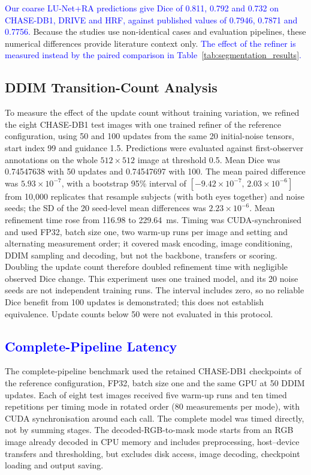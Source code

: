\documentclass[jimaging,article,submit,pdftex,moreauthors]
  {Definitions/mdpi}
\DeclareRobustCommand{\rev}[1]{\textcolor{blue}{#1}}
\newcommand{\revbegin}{\begingroup\color{blue}}
\DeclareRobustCommand{\rev}[1]{#1}
\newcommand{\revbegin}{\begingroup}
\newcommand{\revend}{\ifhmode\par\fi\endgroup}
\providecommand{\linelabel}[1]{}
\newcommand{\seclabel}[1]{\linelabel{rev:sec:#1}}
\newcommand{\secend}[1]{\linelabel{rev:end:#1}}
\begin{document}
\rev{Our coarse LU-Net+RA predictions give Dice of 0.811, 0.792 and 0.732 on CHASE-DB1, DRIVE and HRF, against published values of 0.7946, 0.7871 and 0.7756.} Because the studies use non-identical cases and evaluation pipelines, these numerical differences provide literature context only. \rev{The effect of the refiner is measured instead by the paired comparison in Table~\ref{tab:segmentation_results}.}\secend{published}

\subsection{DDIM Transition-Count Analysis}
\label{sec:ddim_count}
\seclabel{ddim_count}

\revbegin{}To measure the effect of the update count without training variation, we refined the eight CHASE-DB1 test images with one trained refiner of the reference configuration, using 50 and 100 updates from the same 20 initial-noise tensors, start index 99 and guidance 1.5. Predictions were evaluated against first-observer annotations on the whole $512\times512$ image at threshold 0.5. Mean Dice was 0.74547638 with 50 updates and 0.74547697 with 100. The mean paired difference was $5.93\times10^{-7}$, with a bootstrap 95\% interval of $[-9.42\times10^{-7},\,2.03\times10^{-6}]$ from 10,000 replicates that resample subjects (with both eyes together) and noise seeds; the SD of the 20 seed-level mean differences was $2.23\times10^{-6}$. Mean refinement time rose from 116.98 to 229.64~ms. Timing was CUDA-synchronised and used FP32, batch size one, two warm-up runs per image and setting and alternating measurement order; it covered mask encoding, image conditioning, DDIM sampling and decoding, but not the backbone, transfers or scoring. Doubling the update count therefore doubled refinement time with negligible observed Dice change. This experiment uses one trained model, and its 20 noise seeds are not independent training runs. The interval includes zero, so no reliable Dice benefit from 100 updates is demonstrated; this does not establish equivalence. Update counts below 50 were not evaluated in this protocol.\secend{ddim_count}\revend{}

\subsection{\rev{Complete-Pipeline Latency}}
\label{sec:latency}
\seclabel{latency}

\revbegin{}The complete-pipeline benchmark used the retained CHASE-DB1 checkpoints of the reference configuration, FP32, batch size one and the same GPU at 50 DDIM updates. Each of eight test images received five warm-up runs and ten timed repetitions per timing mode in rotated order (80 measurements per mode), with CUDA synchronisation around each call. The complete model was timed directly, not by summing stages. The decoded-RGB-to-mask mode starts from an RGB image already decoded in CPU memory and includes preprocessing, host--device transfers and thresholding, but excludes disk access, image decoding, checkpoint loading and output saving.
\end{document}
